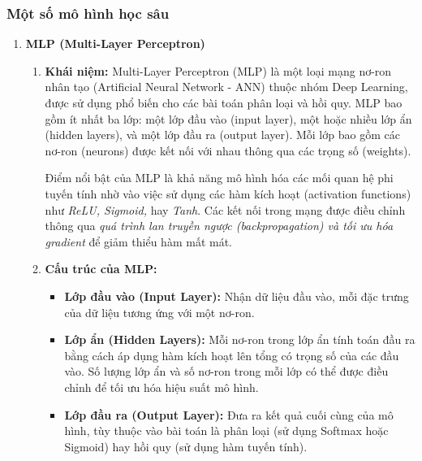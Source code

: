 \documentclass[13pt]{article}
\begin{document}
\subsubsection{Một số mô hình học sâu}
\begin{enumerate}
    \item \textbf{MLP (Multi-Layer Perceptron)}
    \begin{enumerate}
        \item \textbf{Khái niệm: }
        Multi-Layer Perceptron (MLP) là một loại mạng nơ-ron nhân tạo (Artificial Neural Network - ANN) thuộc nhóm Deep Learning, được sử dụng phổ biến cho các bài toán phân loại và hồi quy. MLP bao gồm ít nhất ba lớp: một lớp đầu vào (input layer), một hoặc nhiều lớp ẩn (hidden layers), và một lớp đầu ra (output layer). Mỗi lớp bao gồm các nơ-ron (neurons) được kết nối với nhau thông qua các trọng số (weights).
        
        Điểm nổi bật của MLP là khả năng mô hình hóa các mối quan hệ phi tuyến tính nhờ vào việc sử dụng các hàm kích hoạt (activation functions) như \textit{ReLU, Sigmoid,} hay \textit{Tanh}. Các kết nối trong mạng được điều chỉnh thông qua \textit{quá trình lan truyền ngược (backpropagation) và tối ưu hóa gradient} để giảm thiểu hàm mất mát.

        \item \textbf{Cấu trúc của MLP:}
        \begin{itemize}
            \item \textbf{Lớp đầu vào (Input Layer): } Nhận dữ liệu đầu vào, mỗi đặc trưng của dữ liệu tương ứng với một nơ-ron.
            \item \textbf{Lớp ẩn (Hidden Layers): } Mỗi nơ-ron trong lớp ẩn tính toán đầu ra bằng cách áp dụng hàm kích hoạt lên tổng có trọng số của các đầu vào. Số lượng lớp ẩn và số nơ-ron trong mỗi lớp có thể được điều chỉnh để tối ưu hóa hiệu suất mô hình.
            \item \textbf{Lớp đầu ra (Output Layer): } Đưa ra kết quả cuối cùng của mô hình, tùy thuộc vào bài toán là phân loại (sử dụng Softmax hoặc Sigmoid) hay hồi quy (sử dụng hàm tuyến tính).
        \end{itemize}


\end{enumerate}
\end{enumerate}
\end{document}
